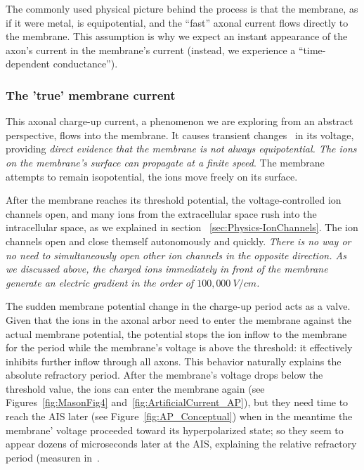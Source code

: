 The commonly used physical picture behind the process is that the
membrane, as if it were metal, is equipotential, %
and the ``fast'' axonal current flows directly to the membrane.
This assumption is why we expect an instant appearance of the axon's current
in the membrane's current (instead, we experience a ``time-dependent
conductance'').



\subsubsection{The 'true' membrane current \label{sec:Physics-TrueMembraneCurrent}}

This axonal charge-up current, a phenomenon we are exploring from
an abstract perspective, flows into the membrane.
It causes transient changes~\cite{TransientResponses:2008,KochElectricalPropertiesSpike:1983} in its voltage, providing \textit{direct evidence that the membrane is not always equipotential. The ions on the membrane’s surface can propagate at a finite speed}.
The membrane attempts
to remain isopotential, the ions move freely on its surface. 

After the membrane reaches its threshold potential, the voltage-controlled ion channels open, and many ions from the extracellular space rush into the intracellular space, as we explained in section ~\ref{sec:Physics-IonChannels}.
The ion channels open and close themself autonomously and quickly.
\emph{There is no way or no need to simultaneously open other ion channels in the opposite
direction. As we discussed above, the charged ions immediately in front of the membrane generate an electric gradient in the order of $100,000\ V/cm$.} 

The sudden membrane potential change in the charge-up
period acts as a valve. Given that the ions in the axonal arbor need to enter
	the membrane against the actual membrane potential, the potential stops the ion inflow to the membrane for the period while the membrane's voltage is above the threshold: it effectively inhibits further inflow through
all axons. This behavior naturally explains the absolute refractory
period. After the membrane's voltage drops below the threshold value,
the ions can enter the membrane again (see Figures~\ref{fig:MasonFig4} and~\ref{fig:ArtificialCurrent_AP}),
but they need time to reach the \gls{AIS}
later (see Figure~\ref{fig:AP_Conceptual}) when in the meantime
the membrane' voltage proceeded toward its hyperpolarized state;
so they seem to appear dozens of microseconds later at the \gls{AIS},
explaining the relative refractory period (measuren in~\cite{APTemperatureDependenceRefractory:2001}.


